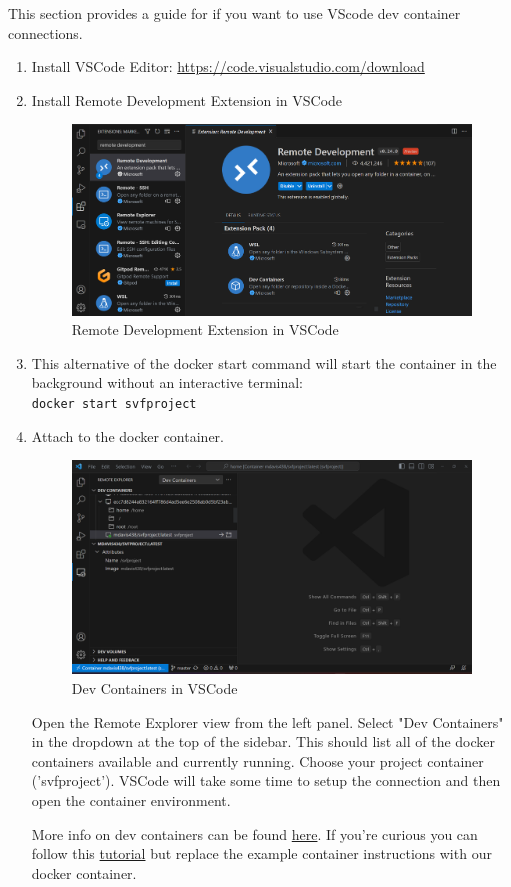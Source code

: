 \documentclass[12pt]{article}
\newcommand{\codeIn}[1]{{\small\tt{#1}}}
\begin{document}
This section provides a guide for if you want to use VScode dev container connections.

\begin{enumerate}
    \item Install VSCode Editor: \url{https://code.visualstudio.com/download}
    
    \item Install Remote Development Extension in VSCode
    \begin{figure}[htpb]
        \centering
        \includegraphics[width=0.8\linewidth]{extension.png}
        \caption{Remote Development Extension in VSCode}
        \label{fig:install_docker}
    \end{figure}

    \item This alternative of the docker start command will start the container in the background without an interactive terminal:\\
    \codeIn{docker start svfproject}

    \item Attach to the docker container. 
    
    \begin{figure}[htpb]
        \centering
        \includegraphics[width=0.8\linewidth]{attach.png}
        \caption{Dev Containers in VSCode}
        \label{fig:install_docker}
    \end{figure}
    Open the Remote Explorer view from the left panel. Select "Dev Containers" in the dropdown at the top of the sidebar. This should list all of the docker containers available and currently running. Choose your project container ('svfproject'). VSCode will take some time to setup the connection and then open the container environment.

    More info on dev containers can be found \href{https://code.visualstudio.com/docs/devcontainers/containers}{here}. If you're curious you can follow this \href{https://code.visualstudio.com/docs/devcontainers/tutorial}{tutorial} but replace the example container instructions with our docker container.
    
\end{enumerate}
\end{document}
